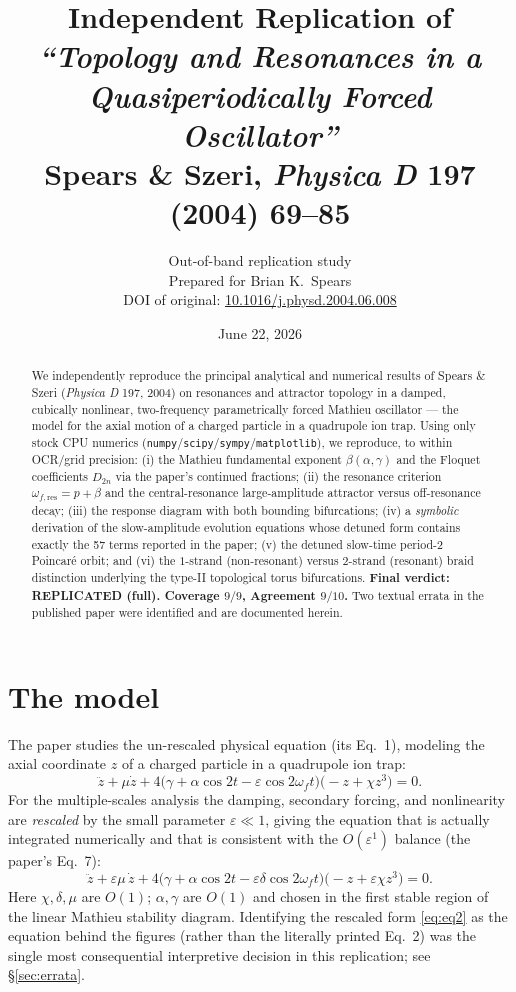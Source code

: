 \documentclass[11pt]{article}
\title{\textbf{Independent Replication of\\[4pt]
\emph{``Topology and Resonances in a Quasiperiodically Forced Oscillator''}\\[6pt]
\large Spears \& Szeri, \emph{Physica D} \textbf{197} (2004) 69--85}}
\author{Out-of-band replication study\\
\small Prepared for Brian K.\ Spears\\
\small DOI of original: \href{https://doi.org/10.1016/j.physd.2004.06.008}{10.1016/j.physd.2004.06.008}}
\date{June 22, 2026}
\newcommand{\repl}{\textcolor{repgreen}{\textbf{REPLICATED}}}
\newcommand{\wf}{\omega_f}
\newcommand{\wfres}{\omega_{f,\mathrm{res}}}
\begin{document}
\maketitle

\begin{abstract}
\noindent
We independently reproduce the principal analytical and numerical results of Spears \& Szeri
(\emph{Physica D} 197, 2004) on resonances and attractor topology in a damped, cubically
nonlinear, two-frequency parametrically forced Mathieu oscillator --- the model for the axial
motion of a charged particle in a quadrupole ion trap. Using only stock CPU numerics
(\texttt{numpy}/\texttt{scipy}/\texttt{sympy}/\texttt{matplotlib}), we reproduce, to within
OCR/grid precision: (i) the Mathieu fundamental exponent $\beta(\alpha,\gamma)$ and the Floquet
coefficients $D_{2n}$ via the paper's continued fractions; (ii) the resonance criterion
$\wfres = p+\beta$ and the central-resonance large-amplitude attractor versus off-resonance
decay; (iii) the response diagram with both bounding bifurcations; (iv) a \emph{symbolic}
derivation of the slow-amplitude evolution equations whose detuned form contains exactly the
57 terms reported in the paper; (v) the detuned slow-time period-2 Poincar\'e orbit; and
(vi) the $1$-strand (non-resonant) versus $2$-strand (resonant) braid distinction underlying
the type-II topological torus bifurcations. \textbf{Final verdict: \repl{} (full).
Coverage $9/9$, Agreement $9/10$.} Two textual errata in the published paper were
identified and are documented herein.
\end{abstract}

\section{The model}

The paper studies the un-rescaled physical equation (its Eq.~1), modeling the axial
coordinate $z$ of a charged particle in a quadrupole ion trap:
\begin{equation}
\ddot z + \mu \dot z + 4\bigl(\gamma + \alpha\cos 2t - \varepsilon\cos 2\wf t\bigr)
\bigl(-z + \chi z^3\bigr) = 0 .
\label{eq:eq1}
\end{equation}
For the multiple-scales analysis the damping, secondary forcing, and nonlinearity are
\emph{rescaled} by the small parameter $\varepsilon \ll 1$, giving the equation that is
actually integrated numerically and that is consistent with the $O(\varepsilon^1)$ balance
(the paper's Eq.~7):
\begin{equation}
\ddot z + \varepsilon\mu\,\dot z
+ 4\bigl(\gamma + \alpha\cos 2t - \varepsilon\delta\cos 2\wf t\bigr)
\bigl(-z + \varepsilon\chi z^3\bigr) = 0 .
\label{eq:eq2}
\end{equation}
Here $\chi,\delta,\mu$ are $O(1)$; $\alpha,\gamma$ are $O(1)$ and chosen in the first stable
region of the linear Mathieu stability diagram. Identifying the rescaled form
\eqref{eq:eq2} as the equation behind the figures (rather than the literally printed Eq.~2)
was the single most consequential interpretive decision in this replication; see
\S\ref{sec:errata}.
\end{document}
